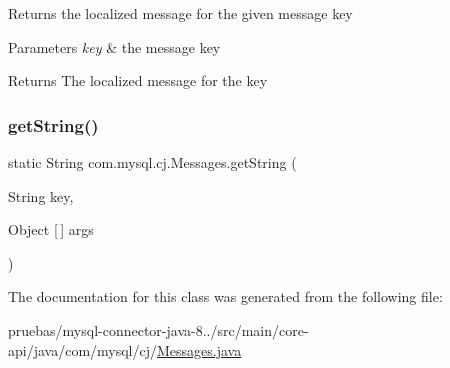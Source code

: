 Returns the localized message for the given message key


\begin{DoxyParams}{Parameters}
{\em key} & the message key \\
\hline
\end{DoxyParams}
\begin{DoxyReturn}{Returns}
The localized message for the key 
\end{DoxyReturn}
\mbox{\label{classcom_1_1mysql_1_1cj_1_1_messages_afbedd0a83c03079eb52039039a24f386}} 
\subsubsection{\texorpdfstring{get\+String()}{getString()}\hspace{0.1cm}{\footnotesize\ttfamily [2/2]}}
{\footnotesize\ttfamily static String com.\+mysql.\+cj.\+Messages.\+get\+String (\begin{DoxyParamCaption}\item[{String}]{key,  }\item[{Object \mbox{[}$\,$\mbox{]}}]{args }\end{DoxyParamCaption})\hspace{0.3cm}{\ttfamily [static]}}



The documentation for this class was generated from the following file\+:\begin{DoxyCompactItemize}
\item 
pruebas/mysql-\/connector-\/java-\/8../src/main/core-\/api/java/com/mysql/cj/\mbox{\hyperlink{_messages_8java}{Messages.\+java}}\end{DoxyCompactItemize}

